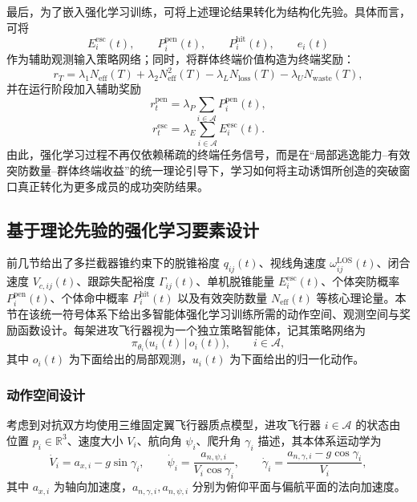 最后，为了嵌入强化学习训练，可将上述理论结果转化为结构化先验。具体而言，可将
\begin{equation}
E_i^{\mathrm{esc}}(t),\qquad
P_i^{\mathrm{pen}}(t),\qquad
P_i^{\mathrm{hit}}(t),\qquad
e_i(t)
\end{equation}
作为辅助观测输入策略网络；同时，将群体终端价值构造为终端奖励：
\begin{equation}
r_T
=
\lambda_1 N_{\mathrm{eff}}(T)
+
\lambda_2 N_{\mathrm{eff}}^2(T)
-
\lambda_L N_{\mathrm{loss}}(T)
-
\lambda_U N_{\mathrm{waste}}(T),
\end{equation}
并在运行阶段加入辅助奖励
\begin{equation}
r_t^{\mathrm{pen}}
=
\lambda_P\sum_{i\in\mathcal{A}} P_i^{\mathrm{pen}}(t),
\end{equation}
\begin{equation}
r_t^{\mathrm{esc}}
=
\lambda_E\sum_{i\in\mathcal{A}} E_i^{\mathrm{esc}}(t).
\end{equation}
由此，强化学习过程不再仅依赖稀疏的终端任务信号，而是在“局部逃逸能力--有效突防数量--群体终端收益”的统一理论引导下，学习如何将主动诱饵所创造的突破窗口真正转化为更多成员的成功突防结果。
\subsection{基于理论先验的强化学习要素设计}
\label{subsec:rl-design}

前几节给出了多拦截器锥约束下的脱锥裕度 $q_{ij}(t)$、视线角速度 $\omega_{ij}^{\mathrm{LOS}}(t)$、闭合速度 $V_{c,ij}(t)$、跟踪失配裕度 $\Gamma_{ij}(t)$、单机脱锥能量 $E_i^{\mathrm{esc}}(t)$、个体突防概率 $P_i^{\mathrm{pen}}(t)$、个体命中概率 $P_i^{\mathrm{hit}}(t)$ 以及有效突防数量 $N_{\mathrm{eff}}(t)$ 等核心理论量。本节在该统一符号体系下给出多智能体强化学习训练所需的动作空间、观测空间与奖励函数设计。每架进攻飞行器视为一个独立策略智能体，记其策略网络为
\begin{equation}
\pi_{\theta_i}\bigl(u_i(t)\,\big|\,o_i(t)\bigr),\qquad i\in\mathcal{A},
\end{equation}
其中 $o_i(t)$ 为下面给出的局部观测，$u_i(t)$ 为下面给出的归一化动作。

\subsubsection{动作空间设计}
\label{subsec:rl-action}

考虑到对抗双方均使用三维固定翼飞行器质点模型，进攻飞行器 $i\in\mathcal{A}$ 的状态由位置 $p_i\in\mathbb{R}^3$、速度大小 $V_i$、航向角 $\psi_i$、爬升角 $\gamma_i$ 描述，其本体系运动学为
\begin{equation}
\dot V_i=a_{x,i}-g\sin\gamma_i,\qquad
\dot\psi_i=\frac{a_{n,\psi,i}}{V_i\cos\gamma_i},\qquad
\dot\gamma_i=\frac{a_{n,\gamma,i}-g\cos\gamma_i}{V_i},
\label{eq:dyn-3d}
\end{equation}
其中 $a_{x,i}$ 为轴向加速度，$a_{n,\gamma,i},a_{n,\psi,i}$ 分别为俯仰平面与偏航平面的法向加速度。

